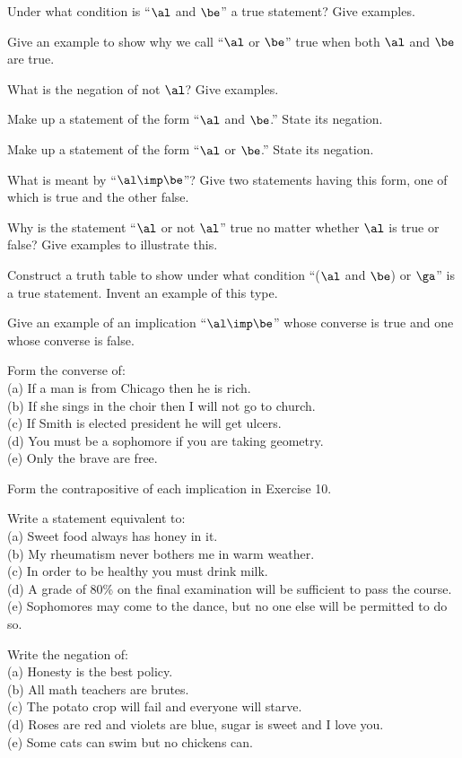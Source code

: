 \documentclass[11pt]{book}
\theoremstyle{bkplain}
\theoremstyle{XIplainnote}
\theoremstyle{bkplain}
\theoremstyle{bkplain}
\begin{document}
\begin{exlist}
\item Under what condition is ``$\al$ and $\be$'' a true statement? Give examples.
\item Give an example to show why we call ``$\al$ or $\be$'' true when both $\al$
      and $\be$ are true.
\item What is the negation of not $\al$? Give examples.
\item Make up a statement of the form ``$\al$ and $\be$.'' State its negation.
\item Make up a statement of the form ``$\al$ or $\be$.'' State its negation.
\item What is meant by ``$\al \imp \be$''? Give two statements having this form,
      one of which is true and the other false.
\item Why is the statement ``$\al$ or not $\al$'' true no matter whether $\al$ is
      true or false? Give examples to illustrate this.
\item[\stex 8.] Construct a truth table to show under what condition
      ``($\al$ and $\be$) or $\ga$'' is a true statement. Invent an example of
      this type.
\item[9.] Give an example of an implication ``$\al \imp \be$'' whose converse is
      true and one whose converse is false.
\item Form the converse of:\\
      (a) If a man is from Chicago then he is rich.\\
      (b) If she sings in the choir then I will not go to church.\\
      (c) If Smith is elected president he will get ulcers.\\
      (d) You must be a sophomore if you are taking geometry.\\
      (e) Only the brave are free.
\item Form the contrapositive of each implication in Exercise 10.
\item Write a statement equivalent to:\\
      (a) Sweet food always has honey in it.\\
      (b) My rheumatism never bothers me in warm weather.\\
      (c) In order to be healthy you must drink milk.\\
      (d) A grade of 80\% on the final examination will be sufficient to pass the
      course.\\
      (e) Sophomores may come to the dance, but no one else will be permitted to
      do so.
\item Write the negation of:\\
      (a) Honesty is the best policy.\\
      (b) All math teachers are brutes.\\
      (c) The potato crop will fail and everyone will starve.\\
      (d) Roses are red and violets are blue, sugar is sweet and I love you.\\
      (e) Some cats can swim but no chickens can.
\end{exlist}
\end{document}

